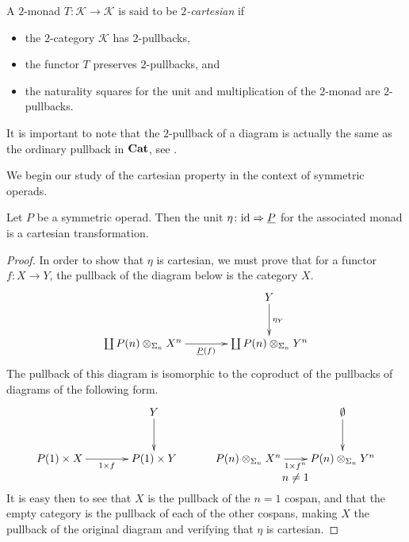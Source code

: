 \begin{Defi}\label{Defi:2cart-monad}
A $2$-monad $T \colon \mathcal{K} \rightarrow \mathcal{K}$ is said to be \textit{$2$-cartesian} if
    \begin{itemize}
        \item the $2$-category $\mathcal{K}$ has $2$-pullbacks,
        \item the functor $T$ preserves $2$-pullbacks, and
        \item the naturality squares for the unit and multiplication of the $2$-monad are $2$-pullbacks.
    \end{itemize}
\end{Defi}

It is important to note that the  $2$-pullback of a diagram is actually the same as the ordinary pullback in $\mathbf{Cat}$, see \cite{kelly-elem}. 

We begin our study of the cartesian property in the context of symmetric operads.

\begin{prop}\label{prop:cart_unit}
Let $P$ be a symmetric operad. Then the unit $\eta \colon \textrm{id} \Rightarrow \underline{P}$ for the associated monad is a cartesian transformation.
\end{prop}
\begin{proof}
In order to show that $\eta$ is cartesian, we must prove that for a functor $f \colon X \rightarrow Y$, the pullback of the diagram below is the category $X$.
    \[
        \xy
            (40,0)*+{Y}="10";
            (0,-15)*+{\coprod \coeqsig{P}{X}{n}}="01";
            (40,-15)*+{\coprod \coeqsig{P}{Y}{n}}="11";
            {\ar^{\eta_Y} "10" ; "11"};
            {\ar_{\underline{P}(f)} "01" ; "11"};
        \endxy
    \]
The pullback of this diagram is isomorphic to the coproduct of the pullbacks of diagrams of the following form.
\[
        \xy
            (30,0)*+{Y}="10";
            (0,-15)*+{P(1) \times X}="01";
            (30,-15)*+{P(1) \times Y}="11";
            {\ar^{} "10" ; "11"};
            {\ar_{1 \times f} "01" ; "11"};
            (90,0)*+{\emptyset}="60";
            (60,-15)*+{\coeqsig{P}{X}{n}}="51";
            (90,-15)*+{\coeqsig{P}{Y}{n}}="61";
            {\ar^{} "60" ; "61"};
            {\ar_{1 \times f^n} "51" ; "61"};
            (75,-21)*{n \neq 1}
        \endxy
    \]
It is easy then to see that $X$ is the pullback of the $n=1$ cospan, and that the empty category is the pullback of each of the other cospans, making $X$ the pullback of the original diagram and verifying that $\eta$ is cartesian.
\end{proof}


